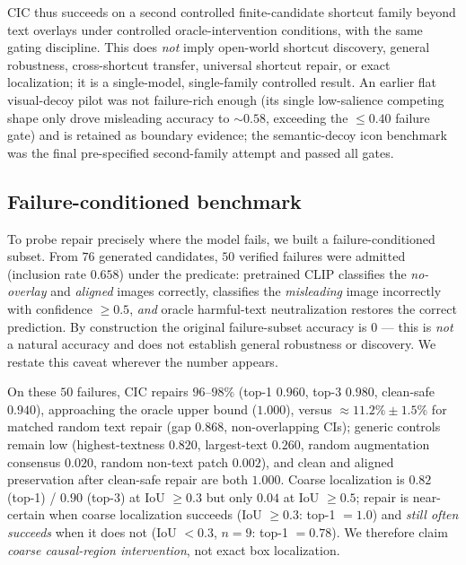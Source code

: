 \documentclass[11pt]{article}
\begin{document}
CIC thus succeeds on a second controlled finite-candidate shortcut family beyond
text overlays under controlled oracle-intervention conditions, with the same
gating discipline. This does \emph{not} imply open-world shortcut discovery,
general robustness, cross-shortcut transfer, universal shortcut repair, or exact
localization; it is a single-model, single-family controlled result. An earlier
flat visual-decoy pilot was not failure-rich enough (its single low-salience
competing shape only drove misleading accuracy to ${\sim}0.58$, exceeding the
$\le 0.40$ failure gate) and is retained as boundary evidence; the semantic-decoy
icon benchmark was the final pre-specified second-family attempt and passed all
gates.

\subsection{Failure-conditioned benchmark}
To probe repair precisely where the model fails, we built a failure-conditioned
subset. From $76$ generated candidates, $50$ verified failures were admitted
(inclusion rate $0.658$) under the predicate: pretrained CLIP classifies the
\emph{no-overlay} and \emph{aligned} images correctly, classifies the
\emph{misleading} image incorrectly with confidence $\ge 0.5$, \emph{and} oracle
harmful-text neutralization restores the correct prediction. By construction the
original failure-subset accuracy is $0$ --- this is \emph{not} a natural accuracy and
does not establish general robustness or discovery. We restate this caveat wherever
the number appears.

On these $50$ failures, CIC repairs $96$--$98\%$ (top-1 $0.960$, top-3 $0.980$,
clean-safe $0.940$), approaching the oracle upper bound ($1.000$), versus
$\approx 11.2\%\pm1.5\%$ for matched random text repair (gap $0.868$, non-overlapping
CIs); generic controls remain low (highest-textness $0.820$, largest-text $0.260$,
random augmentation consensus $0.020$, random non-text patch $0.002$), and clean and
aligned preservation after clean-safe repair are both $1.000$. Coarse localization is
$0.82$ (top-1) / $0.90$ (top-3) at IoU $\ge 0.3$ but only $0.04$ at IoU $\ge 0.5$;
repair is near-certain when coarse localization succeeds (IoU $\ge 0.3$: top-1 $=1.0$)
and \emph{still often succeeds} when it does not (IoU $<0.3$, $n=9$: top-1 $=0.78$). We
therefore claim \emph{coarse causal-region intervention}, not exact box localization.
\end{document}
